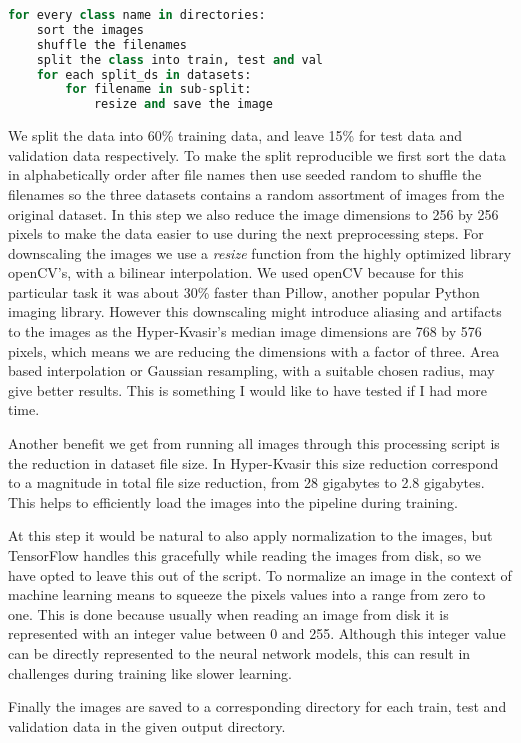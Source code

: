 \documentclass[thesis.tex]{subfiles}
\begin{document}
\begin{lstlisting}[language=Python]
for every class name in directories:
	sort the images
	shuffle the filenames
	split the class into train, test and val
	for each split_ds in datasets:
		for filename in sub-split:
			resize and save the image
\end{lstlisting}

We split the data into 60\% training data, and leave 15\% for test data and validation data respectively. To make the split reproducible we first sort the data in alphabetically order after file names then use seeded random to shuffle the filenames so the three datasets contains a random assortment of images from the original dataset. 
In this step we also reduce the image dimensions to 256 by 256 pixels to make the data easier to use during the next preprocessing steps. For downscaling the images we use a \textit{resize} function from the highly optimized library openCV's, with a bilinear interpolation. We used openCV because for this particular task it was about 30\% faster than Pillow, another popular Python imaging library. However this downscaling might introduce aliasing and artifacts to the images as the Hyper-Kvasir's median image dimensions are 768 by 576 pixels, which means we are reducing the dimensions with a factor of three. Area based interpolation \cite{AreaBased99} or Gaussian resampling, with a suitable chosen radius, may give better results. This is something I would like to have tested if I had more time.

Another benefit we get from running all images through this processing script is the reduction in dataset file size. In Hyper-Kvasir this size reduction correspond to a magnitude in total file size reduction, from 28 gigabytes to 2.8 gigabytes. This helps to efficiently load the images into the pipeline during training.

At this step it would be natural to also apply normalization to the images, but TensorFlow handles this gracefully while reading the images from disk, so we have opted to leave this out of the script. To normalize an image in the context of machine learning means to squeeze the pixels values into a range from zero to one. This is done because usually when reading an image from disk it is represented with an integer value between 0 and 255. Although this integer value can be directly represented to the neural network models, this can result in challenges during training like slower learning.

Finally the images are saved to a corresponding directory for each train, test and validation data in the given output directory.
\end{document}
